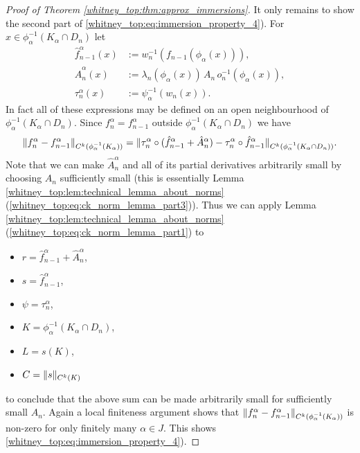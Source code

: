 \begin{proof}[Proof of Theorem \ref{whitney_top:thm:approx_immersions}]
    It only remains to show the second part of \ref{whitney_top:eq:immersion_property_4}). For $x \in \phi_\alpha^{-1}(K_\alpha \cap D_n)$ let 
    \begin{align*}
        \hat{f}_{n-1}^\alpha(x) &:= w_n^{-1}(f_{n-1}(\phi_\alpha(x))), \\
        \hat{A}_n^\alpha(x) &:= \lambda_n(\phi_\alpha(x)) \, A_n \, o_n^{-1}(\phi_\alpha(x)), \\
        \tau_n^\alpha(x) &:= \psi_\alpha^{-1}(w_n(x)).
    \end{align*}
    In fact all of these expressions may be defined on an open neighbourhood of $\phi_\alpha^{-1}(K_\alpha \cap D_n)$. Since $f_n^\alpha = f_{n-1}^\alpha$ outside $\phi_\alpha^{-1}(K_\alpha \cap D_n)$ we have 
    \[
    \lVert f_n^\alpha - f_{n-1}^\alpha\rVert_{C^k(\phi_\alpha^{-1}(K_\alpha))} = \lVert\tau_n^\alpha \circ (\hat{f}_{n-1}^\alpha + \hat{A}_n^\alpha) - \tau_n^\alpha \circ \hat{f}_{n-1}^\alpha\rVert_{C^k(\phi_\alpha^{-1}(K_\alpha \cap D_n))}.
    \]
    Note that we can make $\hat{A}_n^\alpha$ and all of its partial derivatives arbitrarily small by choosing $A_n$ sufficiently small (this is essentially Lemma \ref{whitney_top:lem:technical_lemma_about_norms} (\ref{whitney_top:eq:ck_norm_lemma_part3})). Thus we can apply Lemma \ref{whitney_top:lem:technical_lemma_about_norms} (\ref{whitney_top:eq:ck_norm_lemma_part1}) to 
    \begin{itemize}
    \item $r = \hat{f}_{n-1}^\alpha + \hat{A}_n^\alpha$,
    \item $s = \hat{f}_{n-1}^\alpha$,
    \item $\psi = \tau_n^\alpha$,
    \item $K = \phi_\alpha^{-1}(K_\alpha \cap D_n)$,
    \item $L = s(K)$,
    \item $C = \lVert s\rVert_{C^k(K)}$
    \end{itemize} 
    to conclude that the above sum can be made arbitrarily small for sufficiently small $A_n$. Again a local finiteness argument shows that $\lVert f_n^\alpha - f_{n-1}^\alpha\rVert_{C^k(\phi_\alpha^{-1}(K_\alpha))}$ is non-zero for only finitely many $\alpha \in J$. This shows \ref{whitney_top:eq:immersion_property_4}).



\end{proof}
